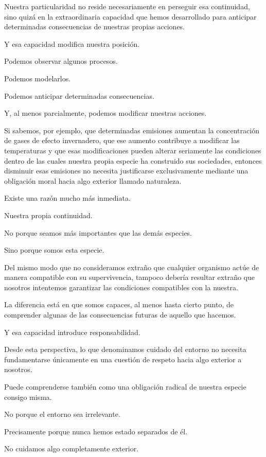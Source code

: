 \documentclass[12pt,a4paper]{article}
\begin{document}
Nuestra particularidad no reside necesariamente en perseguir esa continuidad, sino quizá en la extraordinaria capacidad que hemos desarrollado para anticipar determinadas consecuencias de nuestras propias acciones.

Y esa capacidad modifica nuestra posición.

Podemos observar algunos procesos.

Podemos modelarlos.

Podemos anticipar determinadas consecuencias.

Y, al menos parcialmente, podemos modificar nuestras acciones.

Si sabemos, por ejemplo, que determinadas emisiones aumentan la concentración de gases de efecto invernadero, que ese aumento contribuye a modificar las temperaturas y que esas modificaciones pueden alterar seriamente las condiciones dentro de las cuales nuestra propia especie ha construido sus sociedades, entonces disminuir esas emisiones no necesita justificarse exclusivamente mediante una obligación moral hacia algo exterior llamado naturaleza.

Existe una razón mucho más inmediata.

Nuestra propia continuidad.

No porque seamos más importantes que las demás especies.

Sino porque somos esta especie.

Del mismo modo que no consideramos extraño que cualquier organismo actúe de manera compatible con su supervivencia, tampoco debería resultar extraño que nosotros intentemos garantizar las condiciones compatibles con la nuestra.

La diferencia está en que somos capaces, al menos hasta cierto punto, de comprender algunas de las consecuencias futuras de aquello que hacemos.

Y esa capacidad introduce responsabilidad.

Desde esta perspectiva, lo que denominamos cuidado del entorno no necesita fundamentarse únicamente en una cuestión de respeto hacia algo exterior a nosotros.

Puede comprenderse también como una obligación radical de nuestra especie consigo misma.

No porque el entorno sea irrelevante.

Precisamente porque nunca hemos estado separados de él.

No cuidamos algo completamente exterior.
\end{document}
